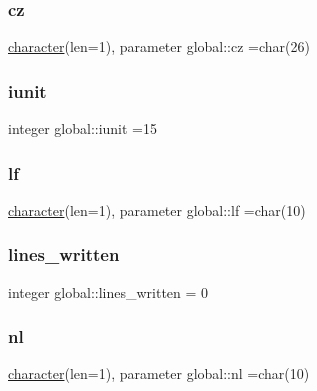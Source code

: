\mbox{\label{namespaceglobal_ae55226f82ca7ee1f12eeb19f4619f98c}} 
\subsubsection{\texorpdfstring{cz}{cz}}
{\footnotesize\ttfamily \hyperlink{option__stopwatch_83_8txt_abd4b21fbbd175834027b5224bfe97e66}{character}(len=1), parameter global\+::cz =char(26)}

\mbox{\label{namespaceglobal_ad88d280367759e82acb4de429dce1caa}} 
\subsubsection{\texorpdfstring{iunit}{iunit}}
{\footnotesize\ttfamily integer global\+::iunit =15}

\mbox{\label{namespaceglobal_a65a09148e3924472bdd8a5735476c7ed}} 
\subsubsection{\texorpdfstring{lf}{lf}}
{\footnotesize\ttfamily \hyperlink{option__stopwatch_83_8txt_abd4b21fbbd175834027b5224bfe97e66}{character}(len=1), parameter global\+::lf =char(10)}

\mbox{\label{namespaceglobal_a85ce1360a8a9498bab52f97d527bee12}} 
\subsubsection{\texorpdfstring{lines\+\_\+written}{lines\_written}}
{\footnotesize\ttfamily integer global\+::lines\+\_\+written = 0}

\mbox{\label{namespaceglobal_a972f6c4dda60a65f2529b3fa30f61ad5}} 
\subsubsection{\texorpdfstring{nl}{nl}}
{\footnotesize\ttfamily \hyperlink{option__stopwatch_83_8txt_abd4b21fbbd175834027b5224bfe97e66}{character}(len=1), parameter global\+::nl =char(10)}

